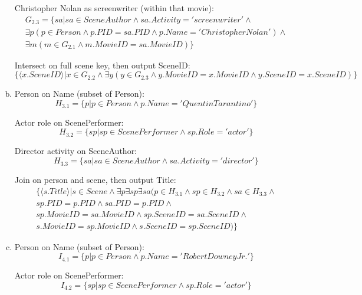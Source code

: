 \documentclass{article}
\begin{document}
\begin{enumerate}[(a)]
Christopher Nolan as screenwriter (within that movie):
\begin{multline}
G_{2.3} = \{sa | sa \in SceneAuthor \land sa.Activity='screenwriter' \land \\
\exists p(p \in Person \land p.PID=sa.PID \land p.Name='Christopher Nolan') \land \\
\exists m(m \in G_{2.1} \land m.MovieID=sa.MovieID)\}
\end{multline}

Intersect on full scene key, then output SceneID:
\begin{equation}
\{\langle x.SceneID \rangle | x \in G_{2.2} \land \exists y(y \in G_{2.3} \land y.MovieID=x.MovieID \land y.SceneID=x.SceneID) \}
\end{equation}

\item
Person on Name (subset of Person):
\begin{equation}
H_{3.1} = \{ p | p \in Person \land p.Name='Quentin Tarantino' \}
\end{equation}

Actor role on ScenePerformer:
\begin{equation}
H_{3.2} = \{ sp | sp \in ScenePerformer \land sp.Role='actor' \}
\end{equation}

Director activity on SceneAuthor:
\begin{equation}
H_{3.3} = \{ sa | sa \in SceneAuthor \land sa.Activity='director' \}
\end{equation}

Join on person and scene, then output Title:
\begin{multline}
\{ \langle s.Title \rangle | s \in Scene \land \exists p\exists sp\exists sa(p \in H_{3.1} \land sp \in H_{3.2} \land sa \in H_{3.3} \land {}\\
 sp.PID=p.PID \land sa.PID=p.PID \land \\
 sp.MovieID=sa.MovieID \land sp.SceneID=sa.SceneID \land \\
 s.MovieID=sp.MovieID \land s.SceneID=sp.SceneID ) \}
\end{multline}

\item
Person on Name (subset of Person):
\begin{equation}
I_{4.1} = \{ p | p \in Person \land p.Name='Robert Downey Jr.' \}
\end{equation}

Actor role on ScenePerformer:
\begin{equation}
I_{4.2} = \{ sp | sp \in ScenePerformer \land sp.Role='actor' \}
\end{equation}


\end{enumerate}
\end{document}
